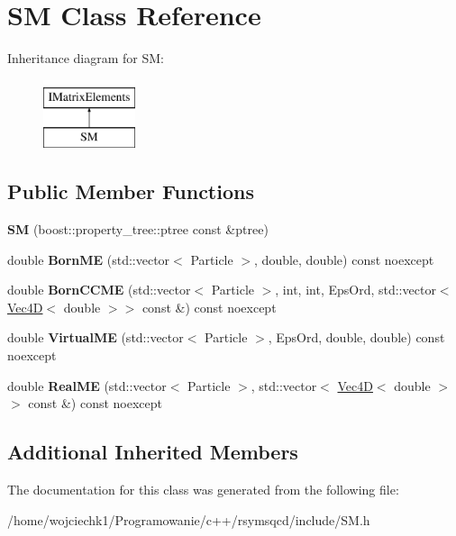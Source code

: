 \hypertarget{classSM}{}\section{SM Class Reference}
\label{classSM}
Inheritance diagram for SM\+:\begin{figure}[H]
\begin{center}
\leavevmode
\includegraphics[height=2.000000cm]{classSM}
\end{center}
\end{figure}
\subsection*{Public Member Functions}
\begin{DoxyCompactItemize}
\item 
\mbox{\label{classSM_ae0cdbc17b42976fdc2b98aa80f5f21f0}} 
{\bfseries SM} (boost\+::property\+\_\+tree\+::ptree const \&ptree)
\item 
\mbox{\label{classSM_a204b9b1ba61483555f49778a71b00701}} 
double {\bfseries Born\+ME} (std\+::vector$<$ Particle $>$, double, double) const noexcept
\item 
\mbox{\label{classSM_a1bad8844522622c280374c7086f25b03}} 
double {\bfseries Born\+C\+C\+ME} (std\+::vector$<$ Particle $>$, int, int, Eps\+Ord, std\+::vector$<$ \hyperlink{classVec4D}{Vec4D}$<$ double $>$$>$ const \&) const noexcept
\item 
\mbox{\label{classSM_aeb5e31743d6bfbdafb7370a46f110f95}} 
double {\bfseries Virtual\+ME} (std\+::vector$<$ Particle $>$, Eps\+Ord, double, double) const noexcept
\item 
\mbox{\label{classSM_abd546052316e2c8a323b40495bcdb461}} 
double {\bfseries Real\+ME} (std\+::vector$<$ Particle $>$, std\+::vector$<$ \hyperlink{classVec4D}{Vec4D}$<$ double $>$$>$ const \&) const noexcept
\end{DoxyCompactItemize}
\subsection*{Additional Inherited Members}


The documentation for this class was generated from the following file\+:\begin{DoxyCompactItemize}
\item 
/home/wojciechk1/\+Programowanie/c++/rsymsqcd/include/S\+M.\+h\end{DoxyCompactItemize}
